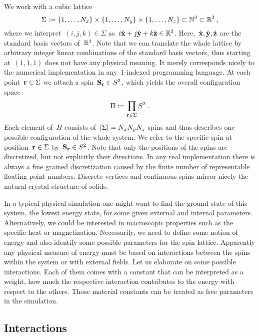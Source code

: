 We work with a cubic lattice
%
\begin{equation}
  \Sigma := \{1,\dots,N_x\} \times \{1,\dots,N_y\} \times
  \{1,\dots,N_z\} \subset \mathbb{N}^3 \subset \mathbb{R}^3\:,
\end{equation}
%
where we interpret~$(i,j,k) \in \Sigma$ as~$i \hat{\mathbf{x}} + j \hat{\mathbf{y}} + k \hat{\mathbf{z}}
\in \mathbb{R}^3$. Here,~$\hat{\mathbf{x}}, \hat{\mathbf{y}}, \hat{\mathbf{z}}$ are the standard basis vectors of~$\mathbb{R}^3$.
Note that we can translate the whole lattice by arbitrary integer linear
combinations of the standard basis vectors, thus starting at~$(1,1,1)$ does not
have any physical meaning. It merely corresponds nicely to the numerical
implementation in any~$1$-indexed programming language. At each point~$\mathbf{r} \in
\Sigma$ we attach a spin~$\mathbf{S}_{\mathbf{r}} \in S^2$, which yields the overall
configuration space
%
\begin{equation}
  \Pi := \prod_{\mathbf{r} \in \Sigma} S^2\:.
\end{equation}
%
Each element of~$\Pi$ consists of~$\abs{\Sigma}=N_x N_y N_z$ spins and thus
describes one possible configuration of the whole system. We refer to the
specific spin at position~$\mathbf{r} \in \Sigma$ by~$\mathbf{S}_{\mathbf{r}} \in S^2$. Note that only
the positions of the spins are discretized, but not explicitly their directions.
In any real implementation there is always a fine grained discretization caused
by the finite number of representable floating point numbers. Discrete vertices
and continuous spins mirror nicely the natural crystal structure of solids.

In a typical physical simulation one might want to find the ground state of this
system, \ie{} the lowest energy state, for some given external and internal
parameters. Alternatively, we could be interested in macroscopic properties such
as the specific heat or magnetization. Necessarily, we need to define some
notion of energy and also identify some possible parameters for the spin
lattice. Apparently any physical measure of energy must be based on interactions
between the spins within the system or with external fields. Let us elaborate on
some possible interactions. Each of them comes with a constant that can be
interpreted as a weight, \ie{} how much the respective interaction contributes
to the energy with respect to the others. Those material constants can be
treated as free parameters in the simulation.

\subsection{Interactions}

